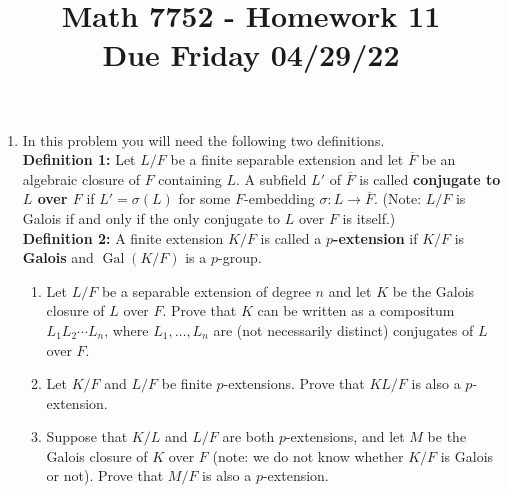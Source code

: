 \documentclass[12pt,
psamsfonts]{amsart}
\title{Math 7752 - Homework 11\\
Due Friday 04/29/22}
\theoremstyle{remark}
\theoremstyle{definition}
\DeclareMathOperator{\ch}{char}
\DeclareMathOperator{\Gal}{Gal}
\numberwithin{equation}{section}
\begin{document}
\maketitle



\begin{enumerate}
\item In this problem you will need the following two definitions. \\
\textbf{Definition 1:} Let $L/F$ be a finite separable extension and let $\overline{F}$ be an algebraic closure of $F$ containing $L$. A subfield $L'$ of $\overline{F}$ is called \textbf{conjugate to $L$ over $F$} if $L'=\sigma(L)$ for some $F$-embedding $\sigma:L\to\overline{F}$. (Note: $L/F$ is Galois if and only if the only conjugate to $L$ over $F$ is itself.) \\
\textbf{Definition 2:} A finite extension $K/F$ is called a \textbf{$p$-extension} if $K/F$ is \textbf{Galois} and $\Gal(K/F)$ is a $p$-group. 
\begin{enumerate}
\item Let $L/F$ be a separable extension of degree $n$ and let $K$ be the Galois closure of $L$ over $F$. Prove that $K$ can be written as a compositum $L_1 L_2\cdots L_n$, where $L_1,\ldots, L_n$ are (not necessarily distinct) conjugates of $L$ over $F$. 
\item Let $K/F$ and $L/F$ be finite $p$-extensions. Prove that $KL/F$ is also a $p$-extension.  
\item Suppose that $K/L$ and $L/F$ are both $p$-extensions, and let $M$ be the Galois closure of $K$ over $F$ (note: we do not know whether $K/F$ is Galois or not). Prove that $M/F$ is also a $p$-extension. 

\end{enumerate}
\end{enumerate}
\end{document}
